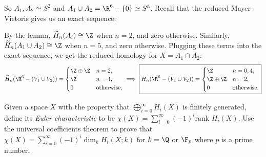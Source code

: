 \documentclass[11pt,letterpaper]{article}
\begin{document}
\begin{solution}
    \quad So $A_1, A_2\simeq S^2$ and $A_1\cup A_2 = \R^6 - \{0\} \simeq S^5$. Recall that the reduced Mayer-Vietoris gives us an exact sequence:
    \begin{center}
    \end{center}  
    By the lemma, $\widetilde{H}_n(A_i)\cong \Z$ when $n=2$, and zero otherwise. Similarly, $\widetilde{H}_n(A_1\cup A_2)\cong \Z$ when $n=5$, and zero otherwise. Plugging these terms into the exact sequence, we get the reduced homology for $X=A_1\cap A_2$:
    \[
        \widetilde{H}_n(\R^6 - (V_1\cup V_2)) = \begin{cases}
            \Z\oplus \Z & n=2,\\
            \Z & n = 4,\\
            0 & \text{otherwise},
        \end{cases}\implies 
        \boxed{{H}_n(\R^6 - (V_1\cup V_2)) = \begin{cases}
            \Z & n = 0, 4,\\
            \Z\oplus \Z & n=2,\\
            0 & \text{otherwise}.
        \end{cases}}
    \]  
\end{solution}

\pagebreak
\begin{problem}
    Given a space $X$ with the property that $\bigoplus^\infty_{i=0} H_i(X)$ is finitely generated, define its \emph{Euler characteristic} to be $\chi(X)=\sum^\infty_{i=0}(-1)^i\text{rank } H_i(X)$. Use the universal coefficients theorem to prove that $\chi(X)=\sum^\infty_{i=0}(-1)^i\dim_k H_i(X; k)$ for $k=\Q$ or $\F_p$ where $p$ is a prime number.
\end{problem}
\end{document}

